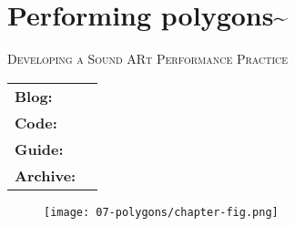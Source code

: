 \chapter{Performing polygons\textasciitilde{}}\label{sec: polygons}
\begin{flushright}
    \Large\textsc{Developing a Sound ARt Performance Practice}
\end{flushright}
\begin{SingleSpace}
    \begin{tabular*}{\textwidth}{@{\extracolsep{\fill}}lr}
        \text{\faEdit}\quad\textbf{Blog:}& \text{\url{https://www.sambilbow.com/projects/polygons}} \\
        \text{\faGithub}\quad\textbf{Code:}&  \text{\url{https://www.github.com/sambilbow/polygons}} \\
        \text{\faListOl}\quad\textbf{Guide:}&  \text{\url{https://www.github.com/sambilbow/polygons/wiki}} \\
        \text{\faFileArchiveO}\quad\textbf{Archive:}& \text{\autoref{sec: appendix-c}}
    \end{tabular*}
\end{SingleSpace}%

\begin{figure}
    \centering
    \texttt{[image: 07-polygons/chapter-fig.png]}
    \captionsetup{labelformat=empty}
    \caption[\autoref*{sec: polygons}'s page-figure: \textit{polygons\textasciitilde{}} in performance at The Rosehill, Brighton, 19th February, (from \citeauthor{bilbow2022b}, \citeyear{bilbow2022b})]{}
\end{figure}

